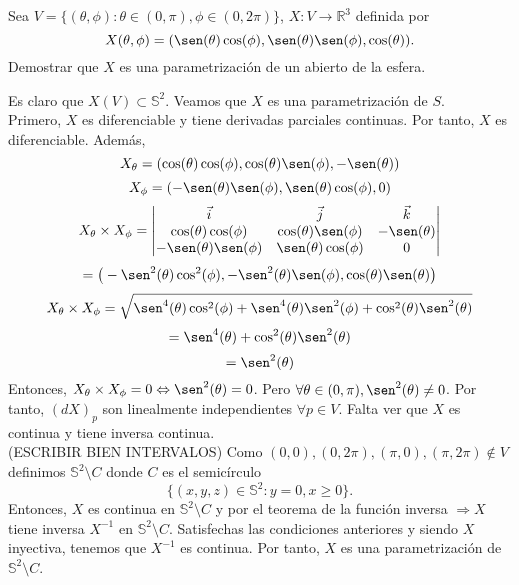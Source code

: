 \begin{ejr}[4]
  Sea $V = \{ (\theta, \phi) : \theta \in (0, \pi), \phi \in (0, 2 \pi) \}$, $X : V \to \mathbb{R}^{3}$ definida por 
  \[ 
    X(\theta, \phi) = (\sen(\theta)\cos(\phi), \sen(\theta)\sen(\phi), \cos(\theta)).
  \] 
  Demostrar que $X$ es una parametrización de un abierto de la esfera.
\end{ejr}

\begin{sol}
  Es claro que $X(V) \subset \mathbb{S}^{2}$. Veamos que $X$ es una parametrización de $S$.\\

  Primero, $X$ es diferenciable y tiene derivadas parciales continuas. Por tanto, $X$ es diferenciable. Además,
  \[ 
    X_{\theta} = (\cos(\theta) \cos(\phi), \cos(\theta) \sen(\phi), -\sen(\theta)) 
  \] 
  \[ 
    X_{\phi} = (-\sen(\theta) \sen(\phi), \sen(\theta) \cos(\phi), 0) 
  \] 
  \[ 
    X_{\theta} \times X_{\phi} =
    \begin{vmatrix}
      \vec{i} & \vec{j} & \vec{k} \\
      \cos(\theta) \cos(\phi) & \cos(\theta) \sen(\phi) & -\sen(\theta) \\
      -\sen(\theta) \sen(\phi) & \sen(\theta) \cos(\phi) & 0
    \end{vmatrix} 
  \] 
  \[ 
    = \big (- \sen^{2}(\theta) \cos^{2}(\phi), -\sen^{2}(\theta) \sen(\phi), \cos(\theta) \sen(\theta) \big ) 
  \] 
  \[ 
    X_{\theta} \times X_{\phi} = \sqrt{\sen^{4}(\theta)\cos^{2}(\phi) + \sen^{4}(\theta) \sen^{2}(\phi) + \cos^{2}(\theta) \sen^{2}(\theta)}
  \] 
  \[ 
    = {\sen^{4}(\theta) + \cos^{2}(\theta) \sen^{2}(\theta)} 
  \] 
  \[ 
    = {\sen^{2}(\theta)}
  \] 
  Entonces, $X_{\theta} \times X_{\phi} = 0 \Leftrightarrow \sen^{2}(\theta) = 0$. Pero $\forall \theta \in (0, \pi), \sen^{2}(\theta) \neq 0$. Por tanto, $(d X)_{p}$ son linealmente independientes $\forall p \in V$. Falta ver que $X$ es continua y tiene inversa continua. \\

  (ESCRIBIR BIEN INTERVALOS)
  Como $(0, 0), (0, 2 \pi), (\pi, 0), (\pi, 2 \pi) \not \in V$ definimos $\mathbb{S}^{2} \setminus C$ donde $C$ es el semicírculo
  \[ 
    \{ (x, y, z) \in \mathbb{S}^{2} : y = 0, x \geq 0 \} .
  \] 
  Entonces, $X$ es continua en $\mathbb{S}^{2} \setminus C$ y por el teorema de la función inversa $\Rightarrow X$ tiene inversa $X^{-1}$ en $\mathbb{S}^{2} \setminus C$. Satisfechas las condiciones anteriores y siendo $X$ inyectiva, tenemos que $X^{-1}$ es continua. Por tanto, $X$ es una parametrización de $\mathbb{S}^{2} \setminus C$.
\end{sol}
